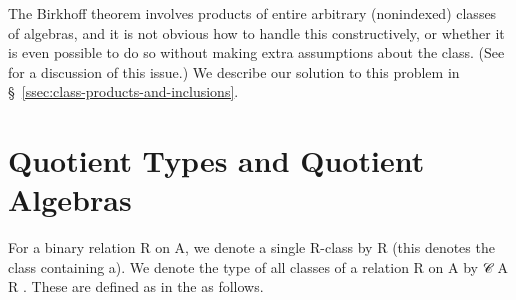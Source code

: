 \documentclass[a4paper,UKenglish,cleveref,autoref,thm-restate]{lipics-v2021}
\begin{document}
The Birkhoff theorem involves products of entire arbitrary (nonindexed) classes of algebras, and it is not obvious how to handle this constructively, or whether it is even possible to do so without making extra assumptions about the class. (See~\cite{Carlstrom:2008} for a discussion of this issue.)  We describe our solution to this problem in \S~\ref{ssec:class-products-and-inclusions}.


\section{Quotient Types and Quotient Algebras}\label{sec:quotient-types-and-quotient-algebras}
For a binary relation \ab R on \ab A, we denote a single \ab R-class by \af [ \ab a \af ] \ab R (this denotes the class containing \ab a). We denote the type of all classes of a relation \ab R on \ab A by \af 𝒞 \as{\{} \ab A \as{\}} \as{\{} \ab R \as{\}}.  These are defined as in the \ualib as follows.
\ccpad
\end{document}
